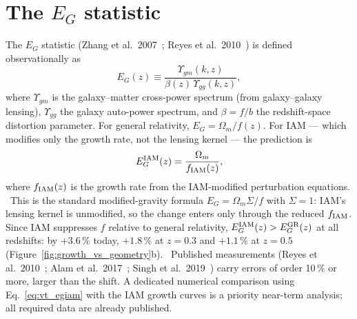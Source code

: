 \section{The $E_G$ statistic}\label{sec:vt_eg}
The $E_G$ statistic (Zhang et al.\ 2007~\cite{Zhang2007EG}; Reyes et al.\ 2010~\cite{Reyes2010}) is defined observationally as
\begin{equation}
E_G(z)\equiv\frac{\Upsilon_{gm}(k,z)}{\beta(z)\,\Upsilon_{gg}(k,z)},\label{eq:vt_eg}
\end{equation}
where $\Upsilon_{gm}$ is the galaxy--matter cross-power spectrum (from galaxy--galaxy lensing), $\Upsilon_{gg}$ the galaxy auto-power spectrum, and $\beta=f/b$
the redshift-space distortion parameter. For general relativity, $E_G=\Omega_m/f(z)$. For IAM --- which modifies only the growth rate, not the lensing
kernel --- the prediction is
\begin{equation}
E_G^{\rm IAM}(z)=\frac{\Omega_m}{f_{\rm IAM}(z)},\label{eq:vt_egiam}
\end{equation}
where $f_{\rm IAM}(z)$ is the growth rate from the IAM-modified perturbation equations. \derived\ This is the standard modified-gravity formula
$E_G=\Omega_m\Sigma/f$ with $\Sigma=1$: IAM's lensing kernel is unmodified, so the change enters only through the reduced $f_{\rm IAM}$. Since IAM
suppresses $f$ relative to general relativity, $E_G^{\rm IAM}(z)>E_G^{\rm GR}(z)$ at all redshifts: by $+3.6\,\%$ today, $+1.8\,\%$ at $z=0.3$ and $+1.1\,\%$ at
$z=0.5$ (Figure~\ref{fig:growth_vs_geometry}b). \prediction\ Published measurements (Reyes et al.\ 2010~\cite{Reyes2010}; Alam et al.\ 2017~\cite{Alam2017};
Singh et al.\ 2019~\cite{Singh2019}) carry errors of order 10\,\% or more, larger than the shift. A dedicated numerical comparison using
Eq.~\eqref{eq:vt_egiam} with the IAM growth curves is a priority near-term analysis; all required data are already published. \openprob

